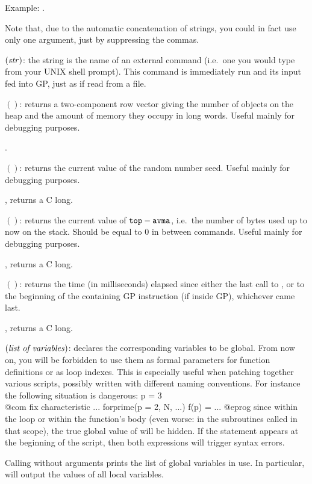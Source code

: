 Example: .

Note that, due to the automatic concatenation of strings, you could in fact
use only one argument, just by suppressing the commas.

$(\hbox{\it str\/})$: the string  is the name
of an external command (i.e.~one you would type from your UNIX shell prompt).
This command is immediately run and its input fed into GP, just as if read
from a file.

$()$: returns a two-component row vector giving the
number of objects on the heap and the amount of memory they occupy in long
words. Useful mainly for debugging purposes.

.

$()$: returns the current value of the random number
seed. Useful mainly for debugging purposes.

, returns a C long.

$()$: returns the current value of
${\tt top}-{\tt avma}$, i.e.~the number of bytes used up to now on the stack.
Should be equal to $0$ in between commands. Useful mainly for debugging
purposes.

, returns a C long.

$()$: returns the time (in milliseconds) elapsed since
either the last call to , or to the beginning of the containing
GP instruction (if inside GP), whichever came last.

, returns a C long.

$(\hbox{\it list of variables\/})$: \label{se:global}
declares the corresponding variables to be global. From now on, you will be
forbidden to use them as formal parameters for function definitions or as
loop indexes. This is especially useful when patching together various
scripts, possibly written with different naming conventions. For instance the
following situation is dangerous:
%
\bprog
p = 3   \\@com fix characteristic
...
forprime(p = 2, N, ...)
f(p) = ...
@eprog
since within the loop or within the function's body (even worse: in the
subroutines called in that scope), the true global value of  will be
hidden. If the statement  appears at the beginning of
the script, then both expressions will trigger syntax errors.

Calling  without arguments prints the list of global variables in
use. In particular,  will output the values of all local
variables.

